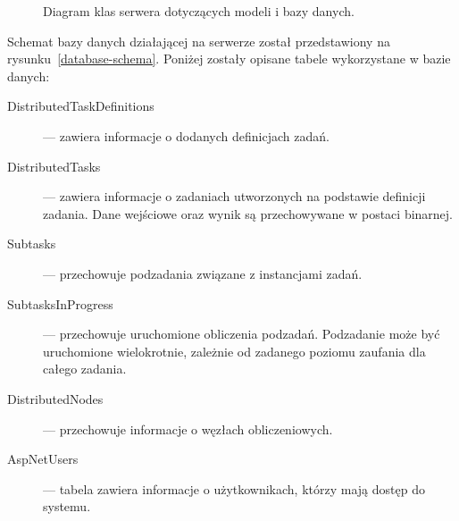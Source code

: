 \documentclass[a4paper,11pt,twoside]{report}
\theoremstyle{definition}
\begin{document}
\begin{figure} 
    \caption{Diagram klas serwera dotyczących modeli i bazy danych.}
    \label{server-class-2}
\end{figure}

Schemat bazy danych działającej na serwerze został przedstawiony na rysunku~\ref{database-schema}.
Poniżej zostały opisane tabele wykorzystane w bazie danych:
\begin{description}
    \item [DistributedTaskDefinitions] --- zawiera informacje o dodanych definicjach zadań.
    \item [DistributedTasks] --- zawiera informacje o zadaniach utworzonych na podstawie definicji zadania. Dane wejściowe oraz wynik są przechowywane w postaci binarnej.
    \item [Subtasks] --- przechowuje podzadania związane z instancjami zadań.
    \item [SubtasksInProgress] --- przechowuje uruchomione obliczenia podzadań. Podzadanie może być uruchomione wielokrotnie, zależnie od zadanego poziomu zaufania dla całego zadania.
    \item [DistributedNodes] --- przechowuje informacje o węzłach obliczeniowych.
    \item [AspNetUsers] --- tabela zawiera informacje o użytkownikach, którzy mają dostęp do systemu.
\end{description}
\end{document}
